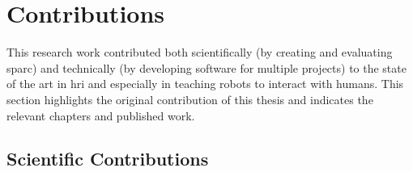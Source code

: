 \section{Contributions}\label{sec:intro_contr}

This research work contributed both scientifically (by creating and evaluating \gls{sparc}) and technically (by developing software for multiple projects) to the state of the art in \gls{hri} and especially in teaching robots to interact with humans. This section highlights the original contribution of this thesis and indicates the relevant chapters and published work.

\subsection{Scientific Contributions}

